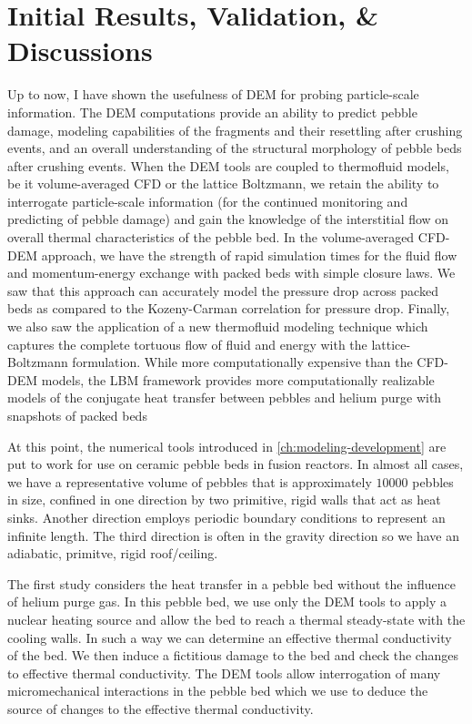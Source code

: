\chapter{Initial Results, Validation, \& Discussions}\label{sec:dem-studies}

Up to now, I have shown the usefulness of DEM for probing particle-scale information. The DEM computations provide an ability to predict pebble damage, modeling capabilities of the fragments and their resettling after crushing events, and an overall understanding of the structural morphology of pebble beds after crushing events. When the DEM tools are coupled to thermofluid models, be it volume-averaged CFD or the lattice Boltzmann, we retain the ability to interrogate particle-scale information (for the continued monitoring and predicting of pebble damage) and gain the knowledge of the interstitial flow on overall thermal characteristics of the pebble bed. In the volume-averaged CFD-DEM approach, we have the strength of rapid simulation times for the fluid flow and momentum-energy exchange with packed beds with simple closure laws. We saw that this approach can accurately model the pressure drop across packed beds as compared to the Kozeny-Carman correlation for pressure drop. Finally, we also saw the application of a new thermofluid modeling technique which captures the complete tortuous flow of fluid and energy with the lattice-Boltzmann formulation. While more computationally expensive than the CFD-DEM models, the LBM framework provides more computationally realizable models of the conjugate heat transfer between pebbles and helium purge with snapshots of packed beds

At this point, the numerical tools introduced in \cref{ch:modeling-development} are put to work for use on ceramic pebble beds in fusion reactors. In almost all cases, we have a representative volume of pebbles that is approximately $10000$ pebbles in size, confined in one direction by two primitive, rigid walls that act as heat sinks. Another direction employs periodic boundary conditions to represent an infinite length. The third direction is often in the gravity direction so we have an adiabatic, primitve, rigid roof/ceiling.

The first study considers the heat transfer in a pebble bed without the influence of helium purge gas. In this pebble bed, we use only the DEM tools to apply a nuclear heating source and allow the bed to reach a thermal steady-state with the cooling walls. In such a way we can determine an effective thermal conductivity of the bed. We then induce a fictitious damage to the bed and check the changes to effective thermal conductivity. The DEM tools allow interrogation of many micromechanical interactions in the pebble bed which we use to deduce the source of changes to the effective thermal conductivity.

